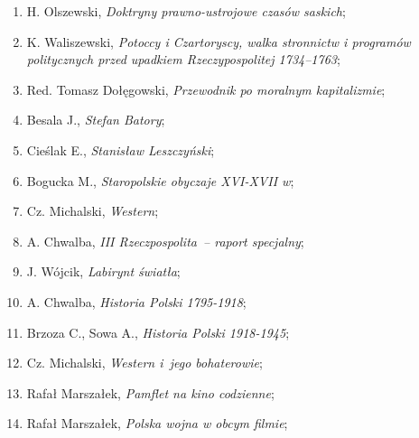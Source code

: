 \documentclass[a4paper,11pt]{article}
\begin{document}
\begin{enumerate}
\item H. Olszewski, \textit{Doktryny prawno-ustrojowe czasów saskich};



\item K. Waliszewski, \textit{Potoccy i Czartoryscy, walka stronnictw i
    programów politycznych przed upadkiem Rzeczypospolitej 1734--1763};



\item Red. Tomasz Dołęgowski, \textit{Przewodnik po moralnym
    kapitalizmie};



\item Besala J., \textit{Stefan Batory};



\item Cieślak E., \textit{Stanisław Leszczyński};



\item Bogucka M., \textit{Staropolskie obyczaje XVI-XVII w};



\item Cz. Michalski, \textit{Western};



\item A. Chwalba, \textit{III Rzeczpospolita~-- raport specjalny};



\item J. Wójcik, \textit{Labirynt światła};



\item A. Chwalba, \textit{Historia Polski 1795-1918};



\item Brzoza C., Sowa A., \textit{Historia Polski 1918-1945};



\item Cz. Michalski, \textit{Western i~jego bohaterowie};



\item Rafał Marszałek, \textit{Pamflet na kino codzienne};



\item Rafał Marszałek, \textit{Polska wojna w obcym filmie};




\end{enumerate}
\end{document}
